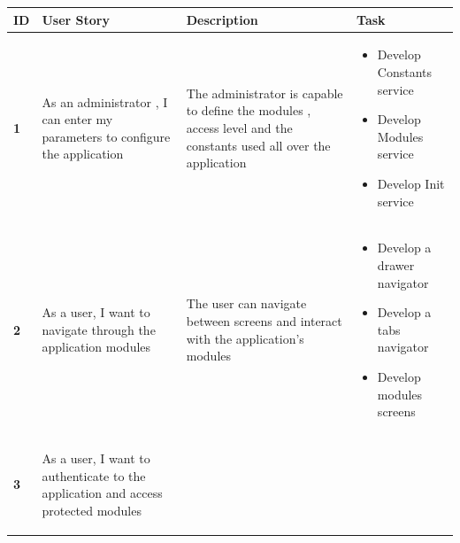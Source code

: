 \begin{table}[H]
    \renewcommand{\arraystretch}{1.2}
    \setlength{\belowcaptionskip}{0.25cm}
 
   \begin{tabular}{|p{}|p{}|p{}|p{}|}
   \hline
   \textbf{ID}  &  \textbf{User Story } & \textbf{Description} & \textbf{Task} \\ \hline


   
   \begin{center}
       \textbf{1}
   \end{center} & \begin{center}
       As an administrator , I can enter my parameters to  configure the application 
   \end{center} &
   The administrator is capable to define the modules , access level and the constants used all over the application 
   & 

       \begin{itemize}[left=0pt, label={\textbf{\Huge .}}]
            \item Develop Constants service   
            \item Develop Modules service   
            \item Develop Init  service   

        \end{itemize} \\ \hline


   \begin{center}
       \textbf{2}
   \end{center} & \begin{center}
       As a  user, I want to navigate through the application modules 
   \end{center} &
   
  The  user can navigate between screens and interact with the application's modules  & 

       \begin{itemize}[left=0pt, label={\textbf{\Huge .}}]
            \item Develop a drawer navigator 
            \item Develop a tabs navigator
            \item Develop modules screens

        \end{itemize} \\ \hline
   \begin{center}
       \textbf{3}
   \end{center} & \begin{center}
       As a  user, I want to authenticate to the application and access protected modules
   \end{center} &
   

\end{tabular}
\end{table}
